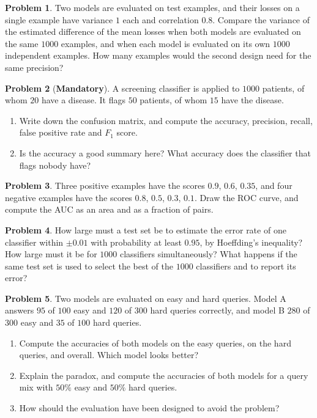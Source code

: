 \documentclass[11pt]{article}
\theoremstyle{definition}
\newtheorem{problem}{Problem}[section]
\newcommand{\mandatory}{\textcolor{red!70!black}{\textbf{Mandatory}}}
\begin{document}
\begin{problem}\label{pr:paired-design}
    Two models are evaluated on test examples, and their losses on a single example have variance $1$ each and correlation $0.8$. Compare the variance of the estimated difference of the mean losses when both models are evaluated on the same $1000$ examples, and when each model is evaluated on its own $1000$ independent examples. How many examples would the second design need for the same precision?
\end{problem}

\begin{problem}[\mandatory]\label{pr:metrics-practice}
    A screening classifier is applied to $1000$ patients, of whom $20$ have a disease. It flags $50$ patients, of whom $15$ have the disease.
    \begin{enumerate}[label=(\alph*)]
        \item Write down the confusion matrix, and compute the accuracy, precision, recall, false positive rate and $F_1$ score.
        \item Is the accuracy a good summary here? What accuracy does the classifier that flags nobody have?
    \end{enumerate}
\end{problem}

\begin{problem}\label{pr:auc-practice}
    Three positive examples have the scores $0.9$, $0.6$, $0.35$, and four negative examples have the scores $0.8$, $0.5$, $0.3$, $0.1$. Draw the ROC curve, and compute the AUC as an area and as a fraction of pairs.
\end{problem}

\begin{problem}\label{pr:generalization-practice}
    How large must a test set be to estimate the error rate of one classifier within $\pm 0.01$ with probability at least $0.95$, by Hoeffding's inequality? How large must it be for $1000$ classifiers simultaneously? What happens if the same test set is used to select the best of the $1000$ classifiers and to report its error?
\end{problem}

\begin{problem}\label{pr:simpson}
    Two models are evaluated on easy and hard queries. Model A answers $95$ of $100$ easy and $120$ of $300$ hard queries correctly, and model B $280$ of $300$ easy and $35$ of $100$ hard queries.
    \begin{enumerate}[label=(\alph*)]
        \item Compute the accuracies of both models on the easy queries, on the hard queries, and overall. Which model looks better?
        \item Explain the paradox, and compute the accuracies of both models for a query mix with $50\%$ easy and $50\%$ hard queries.
        \item How should the evaluation have been designed to avoid the problem?
    \end{enumerate}
\end{problem}
\end{document}
